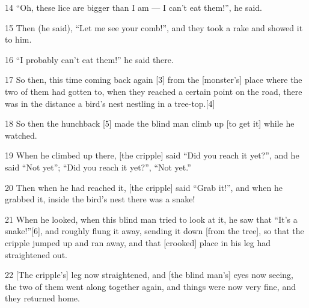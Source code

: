{\LARGE{}14 ``Oh, these lice are bigger than I am --- I can't eat them!'', he said.}

{\LARGE{}15 Then (he said), ``Let me see your comb!'', and they took a rake and
showed it to him.}

{\LARGE{}16 ``I probably can't eat them!'' he said there.}

{\LARGE{}17 So then, this time coming back again [3] from the [monster's] place
where the two of them had gotten to, when they reached a certain point on the road,
there was in the distance a bird's nest nestling in a tree-top.[4]}

{\LARGE{}18 So then the hunchback [5] made the blind man climb up [to get it] while
he watched.}

{\LARGE{}19 When he climbed up there, [the cripple] said ``Did you reach it yet?'',
and he said ``Not yet''; ``Did you reach it yet?'', ``Not yet.''}

{\LARGE{}20 Then when he had reached it, [the cripple] said ``Grab it!'', and when
he grabbed it, inside the bird's nest there was a snake!}

{\LARGE{}21 When he looked, when this blind man tried to look at it, he saw that
``It's a snake!''[6], and roughly flung it away, sending it down [from the tree],
so that the cripple jumped up and ran away, and that [crooked] place in his leg
had straightened out.}

{\LARGE{}22 [The cripple's] leg now straightened, and [the blind man's] eyes now
seeing, the two of them went along together again, and things were now very fine,
and they returned home.}

